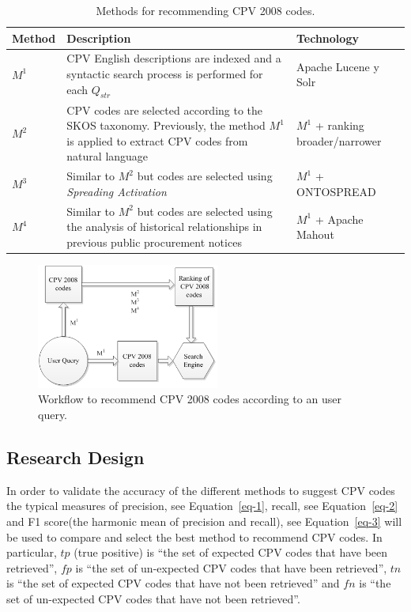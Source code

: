 \begin{table}[!htb]
\renewcommand{\arraystretch}{1.3}
\begin{center}
\begin{tabular}[c]{|l|p{8.5cm}|p{4.5cm}|} 
\hline
\textbf{Method} &  \textbf{Description} &  \textbf{Technology} \\\hline
$M^1$ & CPV English descriptions are indexed and a syntactic search process is performed for each $Q_{str}$ & Apache Lucene y Solr \\ \hline
$M^2$ & CPV codes are selected according to the SKOS taxonomy. Previously, the method $M^1$ is applied to extract CPV codes from natural language & $M^1$ + ranking broader/narrower \\ \hline
$M^3$ & Similar to $M^2$ but codes are selected using \textit{Spreading Activation}& $M^1$ + ONTOSPREAD \\ \hline
$M^4$ & Similar to $M^2$ but codes are selected using the analysis of historical relationships in previous public procurement notices & $M^1$ + Apache Mahout \\ \hline
 \end{tabular}
  \caption{Methods for recommending CPV 2008 codes.}\label{methods-recommending}  
    \end{center}
\end{table}

 \begin{figure}[!ht]
\centering
	\includegraphics[width=6cm]{./imgs/fig-6}
 \caption{Workflow to recommend CPV 2008 codes according to an user query.}
 \label{fig:results-6}
\end{figure}


\subsection{Research Design}
In order to validate the accuracy of the different methods to suggest CPV codes the typical measures of 
precision, see Equation~\ref{eq-1}, recall, see Equation~\ref{eq-2} and F1 score(the harmonic mean of precision and recall), see Equation~\ref{eq-3} will 
be used to compare and select the best method to recommend CPV codes. In particular, $tp$ (true positive) is ``the set of expected CPV codes 
that have been retrieved'', $fp$ is ``the set of un-expected CPV codes that have been retrieved'', 
$tn$ is ``the set of expected CPV codes that have not been retrieved'' and $fn$ is 
``the set of un-expected CPV codes that have not been retrieved''.

